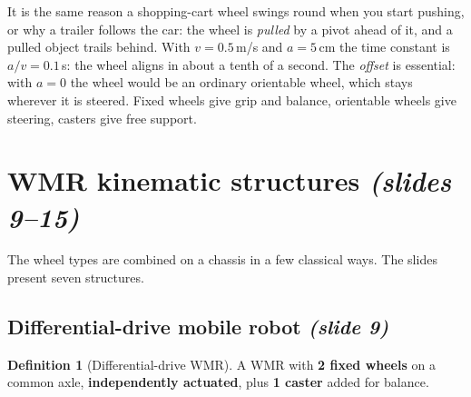 \documentclass[11pt,a4paper]{article}
\theoremstyle{definition}
\newtheorem{definition}{Definition}[section]
\theoremstyle{plain}
\newtheorem{proposition}[definition]{Proposition}
\theoremstyle{remark}
\begin{document}

\begin{intuition}
It is the same reason a shopping-cart wheel swings round when you start pushing, or why a trailer follows the car: the wheel is \emph{pulled} by a pivot ahead of it, and a pulled object trails behind. With $v=0.5$\,m/s and $a=5$\,cm the time constant is $a/v=0.1$\,s: the wheel aligns in about a tenth of a second. The \emph{offset} is essential: with $a=0$ the wheel would be an ordinary orientable wheel, which stays wherever it is steered. Fixed wheels give grip and balance, orientable wheels give steering, casters give free support.
\end{intuition}

\section{WMR kinematic structures \emph{(slides 9--15)}}

The wheel types are combined on a chassis in a few classical ways. The slides present seven structures.

\subsection{Differential-drive mobile robot \emph{(slide 9)}}

\begin{definition}[Differential-drive WMR]
A WMR with \textbf{2 fixed wheels} on a common axle, \textbf{independently actuated}, plus \textbf{1 caster} added for balance.
\end{definition}
\end{document}
